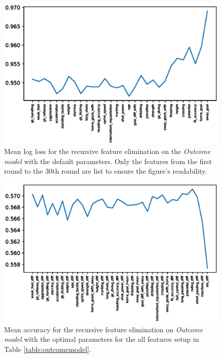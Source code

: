 \begin{figure}[H]
    \centering
    \includegraphics[width=1\textwidth]{img/default_avg_lloss.eps}
    \caption{Mean log loss for the recursive feature elimination on the \textit{Outcome model} with the default parameters. Only the features from the first round to the 30th round are list to ensure the figure's readability.}
    \label{fig:def_avg_loss}
\end{figure}

\begin{figure}[H]
    \centering
    \includegraphics[width=1\textwidth]{img/optimal_avg_accuracy.eps}
    \caption{Mean accuracy for the recursive feature elimination on \textit{Outcome model} with the optimal parameters for the all features setup in Table \ref{table:outcomemodel}.}
    \label{fig:optimal_avg_accu}
\end{figure}

